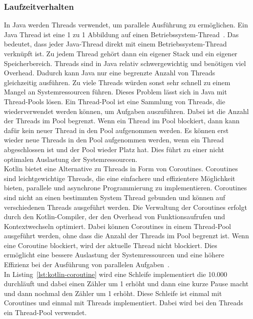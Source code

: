 \documentclass[11pt]{article}
\begin{document}
    \subsubsection{Laufzeitverhalten}
    In Java werden Threads verwendet, um parallele Ausführung zu ermöglichen.
    Ein Java Thread ist eine 1 zu 1 Abbildung auf einen Betriebssystem-Thread~\cite[940]{insel}.
    Das bedeutet, dass jeder Java-Thread direkt mit einem Betriebssystem-Thread verknüpft ist.
    Zu jedem Thread gehört dann ein eigener Stack und ein eigener Speicherbereich.
    Threads sind in Java relativ schwergewichtig und benötigen viel Overhead.
    Dadurch kann Java nur eine begrenzte Anzahl von Threads gleichzeitig ausführen.
    Zu viele Threads würden sonst sehr schnell zu einem Mangel an Systemressourcen führen.
    Dieses Problem lässt sich in Java mit Thread-Pools lösen.
    Ein Thread-Pool ist eine Sammlung von Threads, die wiederverwendet werden können, um Aufgaben auszuführen.
    Dabei ist die Anzahl der Threads im Pool begrenzt.
    Wenn ein Thread im Pool blockiert, dann kann dafür kein neuer Thread in den Pool aufgenommen werden.
    Es können erst wieder neue Threads in den Pool aufgenommen werden, wenn ein Thread abgeschlossen ist und der Pool wieder Platz hat.
    Dies führt zu einer nicht optimalen Auslastung der Systemressourcen.\\
    Kotlin bietet eine Alternative zu Threads in Form von Coroutines.
    Coroutines sind leichtgewichtige Threads, die eine einfachere und effizientere Möglichkeit bieten, parallele und asynchrone Programmierung zu implementieren.
    Coroutines sind nicht an einen bestimmten System Thread gebunden und können auf verschiedenen Threads ausgeführt werden.
    Die Verwaltung der Coroutines erfolgt durch den Kotlin-Compiler, der den Overhead von Funktionsaufrufen und Kontextwechseln optimiert.
    Dabei können Coroutines in einem Thread-Pool ausgeführt werden, ohne dass die Anzahl der Threads im Pool begrenzt ist.
    Wenn eine Coroutine blockiert, wird der aktuelle Thread nicht blockiert.
    Dies ermöglicht eine bessere Auslastung der Systemressourcen und eine höhere Effizienz bei der Ausführung von parallelen Aufgaben~\cite[194]{kotlin-patterns}.
    \\
    In Listing~\ref{lst:kotlin-coroutine} wird eine Schleife implementiert die 10.000 durchläuft und dabei einen Zähler um 1 erhöht und dann eine kurze Pause macht und dann nochmal den Zähler um 1 erhöht.
    Diese Schleife ist einmal mit Coroutines und einmal mit Threads implementiert.
    Dabei wird bei den Threads ein Thread-Pool verwendet.
\end{document}
